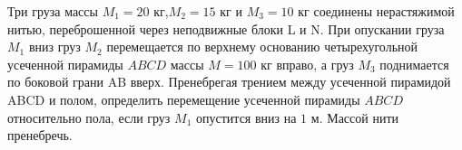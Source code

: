 Три груза массы $M_{1}=20$ кг,$M_{2}=15$ кг и $M_{3}=10$ кг соединены нерастяжимой нитью, переброшенной через неподвижные блоки L и N. При опускании груза $M_{1}$ вниз груз $M_{2}$
перемещается по верхнему основанию четырехугольной усеченной пирамиды $ABCD$ массы $M=100$ кг вправо, а груз $M_{3}$ поднимается по боковой грани AB вверх. Пренебрегая трением между
усеченной пирамидой ABCD и полом, определить перемещение усеченной пирамиды $ABCD$ относительно пола, если груз $M_{1}$ опустится вниз на $1$ м. Массой нити пренебречь.
